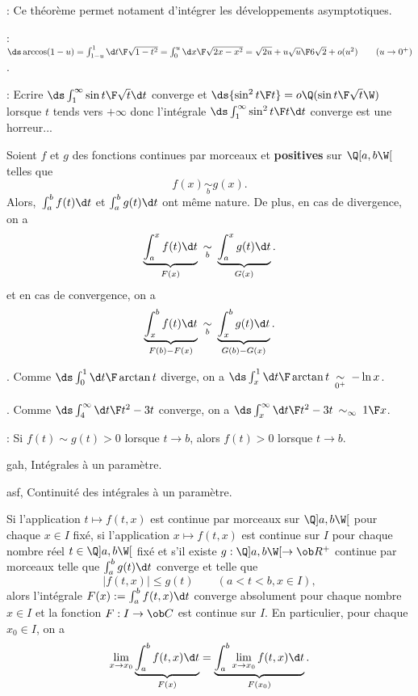 \Remarque : Ce théorème permet notament d'intégrer les développements asymptotiques. 
\bigskip

\Application : $\ds \arccos(1-u)=\int_{1-u}^1{\d t\F\sqrt{1-t^2}}
=\int_0^u{\d x\F\sqrt{2x-x^2}}=\sqrt{2u}+{u\sqrt u\F6\sqrt2}+o(u^2)\qquad(u\to0^+)$. 

%
\bigskip

\Remarque : Ecrire $\ds \int_1^\infty{\sin t\F \sqrt t}\d t$ converge 
et $\ds{\sin^2 t\F t}=o\Q({\sin t\F\sqrt t}\W)$ lorsque $t$ tends vers $+\infty$ 
donc l'intégrale $\ds \int_1^\infty{\sin^2 t\F t}\d t$ converge est une horreur...
\bigskip


\Theoreme [$a\in\ob R$ et $b>a$ un élément de $\ol R$] 
Soient $f$ et $g$ des fonctions continues par morceaux et {\bf positives} sur $\Q[a,b\W[$ telles que 
$$
f(x)\mathop{\sim}\limits_bg(x).
$$ 
Alors,~$\int_a^bf(t)\d t$ et $\int_a^bg(t)\d t$ ont même nature. 
De plus, en cas de divergence, on a 
$$
\underbrace{\int_a^xf(t)\d t}_{F(x)}\ \mathop{\sim}_b\ \underbrace{\int_a^xg(t)\d t}_{G(x)}. 
$$
et en cas de convergence, on a 
$$
\underbrace{\int_x^bf(t)\d t}_{F(b)-F(x)}\ \mathop{\sim}_b\ \underbrace{\int_x^bg(t)\d t}_{G(b)-G(x)}.
$$

\Exemple. Comme $\ds \int_0^1{\d t\F\arctan t}$ diverge, on a $\ds \int_x^1{\d t\F\arctan t}\ \mathop{\sim}\limits_{0^+}\ -\ln x$. 
\bigskip

\Exemple. Comme $\ds \int_4^\infty{\d t\F t^2-3t}$ converge, on a $\ds\int_x^\infty{\d t\F t^2-3t}\ \mathop{\sim}_{\infty}\ {1\F x}$. 
\bigskip

\Remarque : Si $f(t)\sim g(t)>0$ lorsque $t\to b$, alors $f(t)>0$ lorsque $t\to b$. 
\bigskip

\Section gah, Intégrales à un paramètre. 
\bigskip


\Subsection asf, Continuité des intégrales à un paramètre. 

\Theoreme [Index=Theoreme@Théorème!de continuite@de continuité des intégrales à un paramètre;Title=Théorème de continuité des intégrales {\it généralisées}à un paramètre;$a<b$ dans $\ol{\ob R}$, $I$ intervalle, $f:(t,x)\mapsto f(t,x)$ application] 
Si l'application $t\mapsto f(t,x)$ est continue par morceaux sur $\Q]a,b\W[$ pour chaque $x\in I$ fixé, \pn
si l'application $x\mapsto f(t,x)$ est continue sur $I$ pour chaque nombre réel $t\in\Q]a,b\W[$ fixé et \pn
s'il existe $g:\Q]a,b\W[\to\ob R^+$ continue par morceaux telle que $\int_a^bg(t)\d t$ converge et telle que 
$$
\big|f(t,x)\big|\le g(t)\qquad(a<t<b, x\in I), 
$$
alors l'intégrale $F(x):=\int_a^bf(t,x)\d t$ converge absolument pour chaque nombre $x\in I$ et 
la fonction $F:I\to\ob C$ est continue sur $I$. En particulier, pour chaque $x_0\in I$, on a 
$$
\lim_{x\to x_0}\underbrace{\int_a^bf(t,x)\d t}_{F(x)}=\underbrace{\int_a^b\lim_{x\to x_0}f(t,x)\d t}_{F(x_0)}. 
$$

